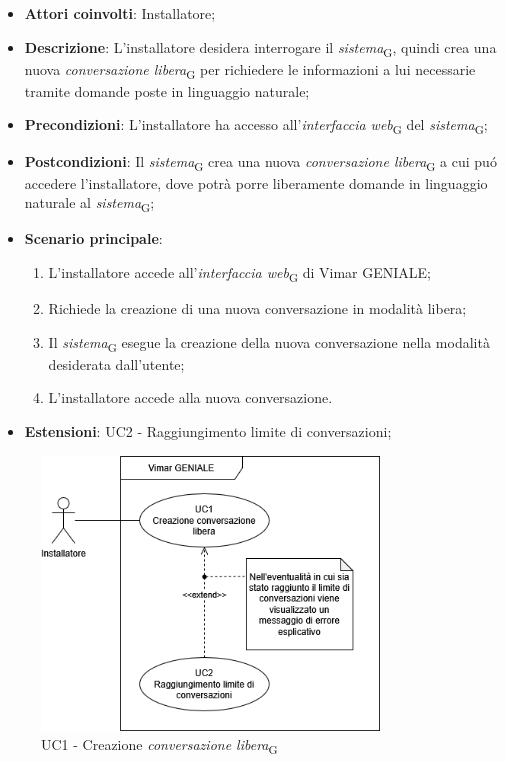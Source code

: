 
\begin{itemize}
    \item \textbf{Attori coinvolti}: Installatore;
    \item \textbf{Descrizione}: L’installatore desidera interrogare il \textit{sistema}\textsubscript{G}, quindi crea una nuova \textit{conversazione libera}\textsubscript{G} per richiedere le informazioni a lui necessarie tramite domande poste in linguaggio naturale;
    \item \textbf{Precondizioni}: L’installatore ha accesso all’\textit{interfaccia web}\textsubscript{G} del \textit{sistema}\textsubscript{G};
    \item \textbf{Postcondizioni}: Il \textit{sistema}\textsubscript{G} crea una nuova \textit{conversazione libera}\textsubscript{G} a cui puó accedere l’installatore, dove potrà porre liberamente domande in linguaggio naturale al \textit{sistema}\textsubscript{G};
    \item \textbf{Scenario principale}:
    \begin{enumerate}
    \item L’installatore accede all’\textit{interfaccia web}\textsubscript{G} di Vimar GENIALE;
    \item Richiede la creazione di una nuova conversazione in modalità libera;
    \item Il \textit{sistema}\textsubscript{G} esegue la creazione della nuova conversazione nella modalità desiderata dall’utente;
    \item  L’installatore accede alla nuova conversazione.
    \end{enumerate}
    \item \textbf{Estensioni}: UC2 - Raggiungimento limite di conversazioni;
\end{itemize}
\begin{figure}[H]
\centering
\includegraphics[width=0.8\textwidth]{contents/casi_duso/png/UC1.png}
\caption{UC1 - Creazione \textit{conversazione libera}\textsubscript{G}}
\end{figure}

